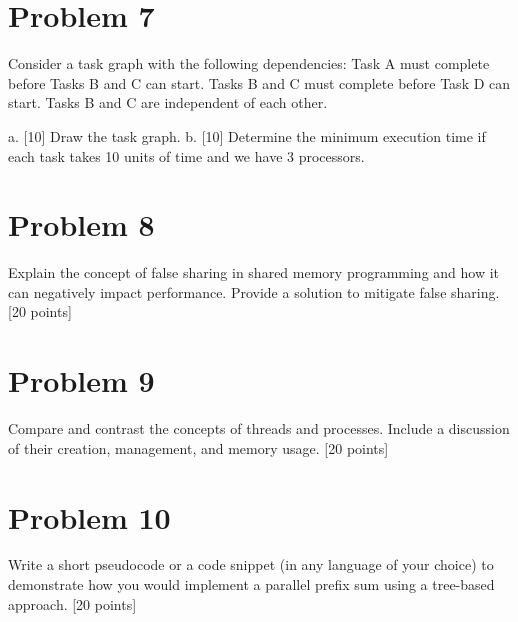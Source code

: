 \documentclass{article}
\begin{document}
\section*{Problem 7}
Consider a task graph with the following dependencies: Task A must complete before Tasks B and C can start. Tasks B and C must complete before Task D can start.  Tasks B and C are independent of each other.

a. [10] Draw the task graph.
b. [10]  Determine the minimum execution time if each task takes 10 units of time and we have 3 processors.


\section*{Problem 8}
Explain the concept of false sharing in shared memory programming and how it can negatively impact performance.  Provide a solution to mitigate false sharing. [20 points]


\section*{Problem 9}
Compare and contrast the concepts of threads and processes.  Include a discussion of their creation, management, and memory usage. [20 points]


\section*{Problem 10}
Write a short pseudocode or a code snippet (in any language of your choice) to demonstrate how you would implement a parallel prefix sum using a tree-based approach.  [20 points]
\end{document}
